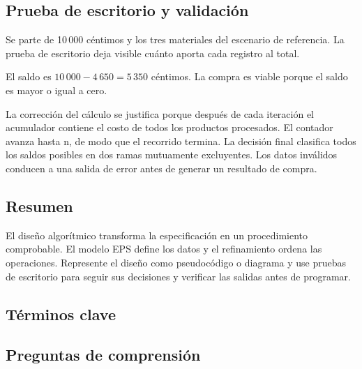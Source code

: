 
\subsection{Prueba de escritorio y validación}

Se parte de 10\,000 céntimos y los tres materiales del escenario de referencia. La prueba de escritorio deja visible cuánto aporta cada registro al total.



El saldo es \(10\,000 - 4\,650 = 5\,350\) céntimos. La compra es viable porque el saldo es mayor o igual a cero.



La corrección del cálculo se justifica porque después de cada iteración el acumulador contiene el costo de todos los productos procesados. El contador avanza hasta n, de modo que el recorrido termina. La decisión final clasifica todos los saldos posibles en dos ramas mutuamente excluyentes. Los datos inválidos conducen a una salida de error antes de generar un resultado de compra.


\subsection{Resumen}

El diseño algorítmico transforma la especificación en un procedimiento comprobable. El modelo EPS define los datos y el refinamiento ordena las operaciones. Represente el diseño como pseudocódigo o diagrama y use pruebas de escritorio para seguir sus decisiones y verificar las salidas antes de programar.

\subsection{Términos clave}



\subsection{Preguntas de comprensión}

